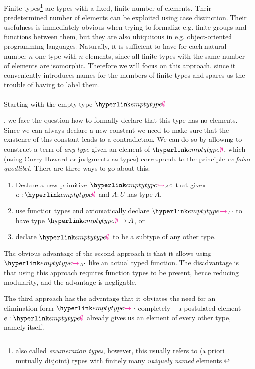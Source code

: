 Finite types\footnote{also called \emph{enumeration types}, however, this usually refers to (a priori mutually disjoint) types with finitely many \emph{uniquely named} elements.} are types with a fixed, finite number of elements. Their predetermined number of elements can be exploited using case distinction. Their usefulness is immediately obvious when trying to formalize e.g. finite groups and functions between them, but they are also ubiquitous in e.g. object-oriented programming languages. Naturally, it is sufficient to have for each natural number $n$ one type with $n$ elements, since all finite types with the same number of elements are isomorphic. Therefore we will focus on this approach, since it conveniently introduces names for the members of finite types and spares us the trouble of having to label them.

\paragraph{} \hypertarget{emptytype}{Starting with the empty type $\emptytype$}, we face the question how to formally declare that this type has no elements. Since we can always declare a new constant  we need to make sure that the existence of this constant leads to a contradiction. We can do so by allowing to construct a term of \emph{any type} given an element of $\emptytype$, which (using Curry-Howard or judgments-as-types) corresponds to the principle \emph{ex falso quodlibet}. There are three ways to go about this:
\begin{enumerate}
	\item Declare a new primitive $\finel eA$ that given $e:\emptytype$ and $A:U$ has type $A$,
	\item use function types and axiomatically declare $\finel\cdot A$ to have type $\emptytype\to A$, or
	\item declare $\emptytype$ to be a subtype of any other type.
\end{enumerate}
The obvious advantage of the second approach is that it allows using $\finel\cdot A$ like an actual typed function. The disadvantage is that using this approach requires function types to be present, hence reducing modularity, and the advantage is negligable. 

The third approach has the advantage that it obviates the need for an elimination form $\finel\cdot\cdot$ completely -- a postulated element $e:\emptytype$ already gives us an element of every other type, namely itself.


